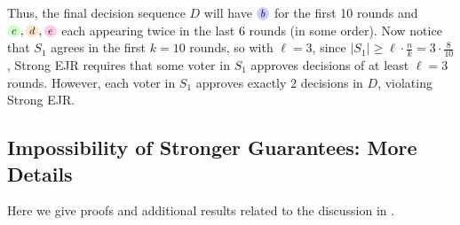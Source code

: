 \documentclass[10pt]{scrartcl}
\theoremstyle{plain}
\theoremstyle{definition}
\renewcommand*{\ge}{\geqslant}
\newcommand{\alternativeb}{\tikz[baseline=-3pt,transform shape,scale=0.85]{\node[text height=6pt,inner sep=1pt,fill=blue!20,   circle,minimum width=12pt] (x) {$b$};}}
\newcommand{\alternativec}{\tikz[baseline=-3pt,transform shape,scale=0.85]{\node[text height=6pt,inner sep=1pt,fill=green!20,  circle,minimum width=12pt] (x) {$c$};}}
\newcommand{\alternatived}{\tikz[baseline=-3pt,transform shape,scale=0.85]{\node[text height=6pt,inner sep=1pt,fill=orange!20, circle,minimum width=12pt] (x) {$d$};}}
\newcommand{\alternativee}{\tikz[baseline=-3pt,transform shape,scale=0.85]{\node[text height=6pt,inner sep=1pt,fill=magenta!20,circle,minimum width=12pt] (x) {$e$};}}
\begin{document}
Thus, the final decision sequence $D$ will have $\alternativeb$ for the first 10 rounds and $\alternativec, \alternatived, \alternativee$ each appearing twice in the last $6$ rounds (in some order). Now notice that $S_1$ agrees in the first $k = 10$ rounds, so with $\ell = 3$, since $|S_1| \ge \ell \cdot \frac{n}{k} = 3 \cdot \frac{8}{10}$, Strong EJR requires that some voter in $S_1$ approves decisions of at least $\ell = 3$ rounds. However, each voter in $S_1$ approves exactly $2$ decisions in $D$, violating Strong EJR. \hfill \qedsymbol






\subsection{Impossibility of Stronger Guarantees: More Details}
\label{app:infeasible-axioms}

Here we give proofs and additional results related to the discussion in .
\end{document}
